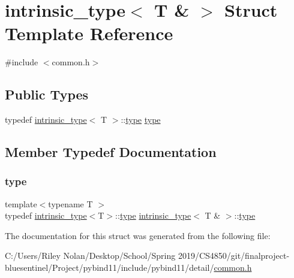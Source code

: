 \hypertarget{structintrinsic__type_3_01_t_01_6_01_4}{}\section{intrinsic\+\_\+type$<$ T \& $>$ Struct Template Reference}
\label{structintrinsic__type_3_01_t_01_6_01_4}


{\ttfamily \#include $<$common.\+h$>$}

\subsection*{Public Types}
\begin{DoxyCompactItemize}
\item 
typedef \mbox{\hyperlink{structintrinsic__type}{intrinsic\+\_\+type}}$<$ T $>$\+::\mbox{\hyperlink{structintrinsic__type_3_01_t_01_6_01_4_a90278c08b44740ba70c14cc7ae7f8954}{type}} \mbox{\hyperlink{structintrinsic__type_3_01_t_01_6_01_4_a90278c08b44740ba70c14cc7ae7f8954}{type}}
\end{DoxyCompactItemize}


\subsection{Member Typedef Documentation}
\mbox{\label{structintrinsic__type_3_01_t_01_6_01_4_a90278c08b44740ba70c14cc7ae7f8954}} 
\subsubsection{\texorpdfstring{type}{type}}
{\footnotesize\ttfamily template$<$typename T $>$ \\
typedef \mbox{\hyperlink{structintrinsic__type}{intrinsic\+\_\+type}}$<$T$>$\+::\mbox{\hyperlink{structintrinsic__type_3_01_t_01_6_01_4_a90278c08b44740ba70c14cc7ae7f8954}{type}} \mbox{\hyperlink{structintrinsic__type}{intrinsic\+\_\+type}}$<$ T \& $>$\+::\mbox{\hyperlink{structintrinsic__type_3_01_t_01_6_01_4_a90278c08b44740ba70c14cc7ae7f8954}{type}}}



The documentation for this struct was generated from the following file\+:\begin{DoxyCompactItemize}
\item 
C\+:/\+Users/\+Riley Nolan/\+Desktop/\+School/\+Spring 2019/\+C\+S4850/git/finalproject-\/bluesentinel/\+Project/pybind11/include/pybind11/detail/\mbox{\hyperlink{detail_2common_8h}{common.\+h}}\end{DoxyCompactItemize}
